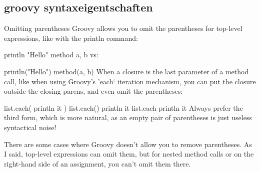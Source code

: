 \documentclass[11pt,english,ngerman, headsepline]{scrreprt}
\begin{document}


\subsection{groovy syntaxeigentschaften}
Omitting parentheses
Groovy allows you to omit the parentheses for top-level expressions, like with the println command:

println "Hello"
method a, b
vs:

println("Hello")
method(a, b)
When a closure is the last parameter of a method call, like when using Groovy's 'each‘ iteration mechanism, you can put the closure outside the closing parens, and even omit the parentheses:

list.each( { println it } )
list.each(){ println it }
list.each  { println it }
Always prefer the third form, which is more natural, as an empty pair of parentheses is just useless syntactical noise!

There are some cases where Groovy doesn't allow you to remove parentheses. As I said, top-level expressions can omit them, but for nested method calls or on the right-hand side of an assignment, you can't omit them there.
\end{document}
